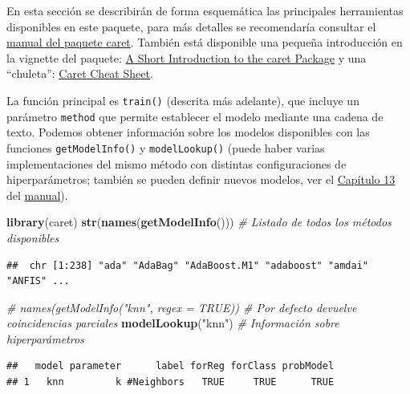 \documentclass[
]{book}
\newenvironment{Shaded}{\begin{snugshade}}{\end{snugshade}}
\newcommand{\CommentTok}[1]{\textcolor[rgb]{0.56,0.35,0.01}{\textit{#1}}}
\newcommand{\KeywordTok}[1]{\textcolor[rgb]{0.13,0.29,0.53}{\textbf{#1}}}
\newcommand{\NormalTok}[1]{#1}
\newcommand{\StringTok}[1]{\textcolor[rgb]{0.31,0.60,0.02}{#1}}
\theoremstyle{break}
\theoremstyle{definition}
\theoremstyle{definition}
\theoremstyle{definition}
\theoremstyle{remark}
\begin{document}
En esta sección se describirán de forma esquemática las principales herramientas disponibles en este paquete, para más detalles se recomendaría consultar el \href{https://topepo.github.io/caret}{manual del paquete caret}.
También está disponible una pequeña introducción en la vignette del paquete: \href{https://cran.r-project.org/web/packages/caret/vignettes/caret.html}{A Short Introduction to the caret Package} y una ``chuleta'': \href{https://raw.githubusercontent.com/rstudio/cheatsheets/master/caret.pdf}{Caret Cheat Sheet}.

La función principal es \texttt{train()} (descrita más adelante), que incluye un parámetro \texttt{method} que permite establecer el modelo mediante una cadena de texto.
Podemos obtener información sobre los modelos disponibles con las funciones \texttt{getModelInfo()} y \texttt{modelLookup()} (puede haber varias implementaciones del mismo método con distintas configuraciones de hiperparámetros; también se pueden definir nuevos modelos, ver el \href{https://topepo.github.io/caret/using-your-own-model-in-train.html}{Capítulo 13} del \href{https://topepo.github.io/caret}{manual}).

\begin{Shaded}
\begin{Highlighting}[]
\KeywordTok{library}\NormalTok{(caret)}
\KeywordTok{str}\NormalTok{(}\KeywordTok{names}\NormalTok{(}\KeywordTok{getModelInfo}\NormalTok{())) }\CommentTok{# Listado de todos los métodos disponibles}
\end{Highlighting}
\end{Shaded}

\begin{verbatim}
##  chr [1:238] "ada" "AdaBag" "AdaBoost.M1" "adaboost" "amdai" "ANFIS" ...
\end{verbatim}

\begin{Shaded}
\begin{Highlighting}[]
\CommentTok{# names(getModelInfo("knn", regex = TRUE)) # Por defecto devuelve coincidencias parciales}
\KeywordTok{modelLookup}\NormalTok{(}\StringTok{"knn"}\NormalTok{)  }\CommentTok{# Información sobre hiperparámetros}
\end{Highlighting}
\end{Shaded}

\begin{verbatim}
##   model parameter      label forReg forClass probModel
## 1   knn         k #Neighbors   TRUE     TRUE      TRUE
\end{verbatim}
\end{document}
